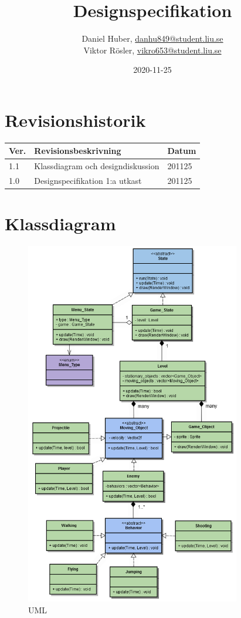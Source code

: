 \documentclass{TDP005mall}
\author{Daniel Huber, \url{danhu849@student.liu.se}\\
  Viktor Rösler, \url{vikro653@student.liu.se}}
\title{Designspecifikation}
\date{2020-11-25}
\begin{document}
\projectpage
\tableofcontents
\newpage
\section{Revisionshistorik}
\begin{table}[!h]
\begin{tabularx}{\linewidth}{|l|X|l|}
\hline
Ver. & Revisionsbeskrivning & Datum \\\hline
1.1 & Klassdiagram och designdiskussion & 201125 \\\hline
1.0 & Designspecifikation 1:a utkast & 201125 \\\hline
\end{tabularx}
\end{table}



\section{Klassdiagram}

\begin{figure}[h!]
  \includegraphics[height=16cm]{UML1.1.png}
  \caption{UML\label{fig:1}}
\end{figure}
\end{document}
